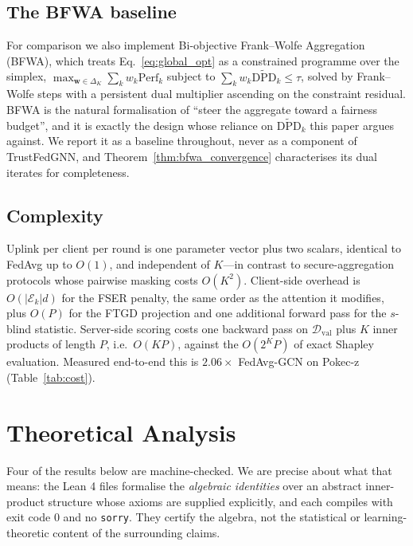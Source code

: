 \documentclass[preprint,12pt]{elsarticle}
\theoremstyle{plain}
\theoremstyle{definition}
\theoremstyle{remark}
\newcommand{\dpd}{\mathrm{DPD}}
\begin{document}
\subsection{The BFWA baseline}
\label{sec:bfwa_baseline}
For comparison we also implement Bi-objective Frank--Wolfe Aggregation (BFWA), which treats Eq.~\eqref{eq:global_opt} as a constrained programme over the simplex, $\max_{\bm{w}\in\Delta_K}\sum_k w_k\mathrm{Perf}_k$ subject to $\sum_k w_k \widetilde{\dpd}_k \le \tau$, solved by Frank--Wolfe steps with a persistent dual multiplier ascending on the constraint residual. BFWA is the natural formalisation of ``steer the aggregate toward a fairness budget'', and it is exactly the design whose reliance on $\widetilde{\dpd}_k$ this paper argues against. We report it as a baseline throughout, never as a component of TrustFedGNN, and Theorem~\ref{thm:bfwa_convergence} characterises its dual iterates for completeness.

\subsection{Complexity}
\label{sec:complexity}
Uplink per client per round is one parameter vector plus two scalars, identical to FedAvg up to $O(1)$, and independent of $K$---in contrast to secure-aggregation protocols whose pairwise masking costs $O(K^2)$. Client-side overhead is $O(\lvert\mathcal{E}_k\rvert d)$ for the FSER penalty, the same order as the attention it modifies, plus $O(P)$ for the FTGD projection and one additional forward pass for the $s$-blind statistic. Server-side scoring costs one backward pass on $\mathcal{D}_{\mathrm{val}}$ plus $K$ inner products of length $P$, i.e.\ $O(KP)$, against the $O(2^K P)$ of exact Shapley evaluation. Measured end-to-end this is $2.06\times$ FedAvg-GCN on Pokec-z (Table~\ref{tab:cost}).

\section{Theoretical Analysis}
\label{sec:theory}

Four of the results below are machine-checked. We are precise about what that means: the Lean 4 files formalise the \emph{algebraic identities} over an abstract inner-product structure whose axioms are supplied explicitly, and each compiles with exit code $0$ and no \texttt{sorry}. They certify the algebra, not the statistical or learning-theoretic content of the surrounding claims.
\end{document}
